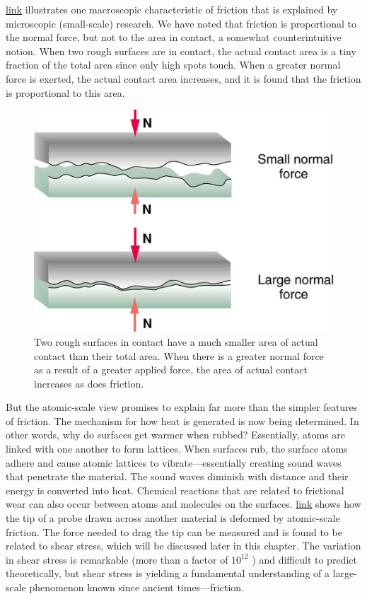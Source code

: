 \documentclass[
]{book}
\begin{document}
\protect\hyperlink{import-auto-id1165298530900}{link} illustrates
one macroscopic characteristic of friction that is explained by
microscopic (small-scale) research. We have noted that friction is
proportional to the normal force, but not to the area in contact, a
somewhat counterintuitive notion. When two rough surfaces are in
contact, the actual contact area is a tiny fraction of the total area
since only high spots touch. When a greater normal force is exerted, the
actual contact area increases, and it is found that the friction is
proportional to this area.

\begin{figure}
\hypertarget{import-auto-id1165298530900}{%
\centering
\includegraphics{images/Figure_06_01_04a.jpg}
\caption{Two rough surfaces in contact have a much smaller area of actual
contact than their total area. When there is a greater normal force as a
result of a greater applied force, the area of actual contact increases
as does
friction.}\label{import-auto-id1165298530900}
}
\end{figure}

But the atomic-scale view promises to explain far more than the simpler
features of friction. The mechanism for how heat is generated is now
being determined. In other words, why do surfaces get warmer when
rubbed? Essentially, atoms are linked with one another to form lattices.
When surfaces rub, the surface atoms adhere and cause atomic lattices to
vibrate---essentially creating sound waves that penetrate the material.
The sound waves diminish with distance and their energy is converted
into heat. Chemical reactions that are related to frictional wear can
also occur between atoms and molecules on the surfaces.
\protect\hyperlink{import-auto-id1165298744656}{link} shows how
the tip of a probe drawn across another material is deformed by
atomic-scale friction. The force needed to drag the tip can be measured
and is found to be related to shear stress, which will be discussed
later in this chapter. The variation in shear stress is remarkable (more
than a factor of \(\text{10}^{\text{12}}{}\) ) and difficult to predict
theoretically, but shear stress is yielding a fundamental understanding
of a large-scale phenomenon known since ancient times---friction.
\end{document}
